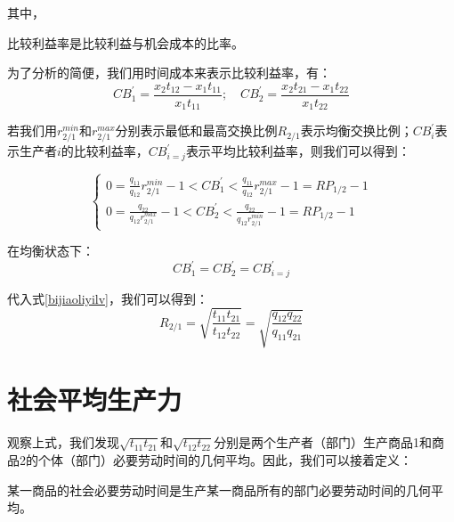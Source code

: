 其中，
\begin{definition}
    比较利益率是比较利益与机会成本的比率\cite[65]{CaiJiMingCongXiaYiJieZhiLunDaoGuangYiJieZhiLunXiuDingBan2022}。
\end{definition}

为了分析的简便，我们用时间成本来表示比较利益率，有：
\begin{equation}
    \label{bijiaoliyilv}
    \mathit{CB}^{\prime}_1 = \frac{x_2 t_{12} - x_1 t_{11}}{x_1 t_{11}}; \quad \mathit{CB}^{\prime}_2 = \frac{x_2 t_{21} - x_1 t_{22}}{x_1 t_{22}}
\end{equation}

若我们用$r^{\mathit{min}}_{2/1}$和$r^{\mathit{max}}_{2/1}$分别表示最低和最高交换比例$\mathit{R}_{2/1}$表示均衡交换比例；$\mathit{CB}^{\prime}_i$表示生产者$i$的比较利益率，$\mathit{CB}^{\prime}_{i=j}$表示平均比较利益率，则我们可以得到\cite[66]{CaiJiMingCongXiaYiJieZhiLunDaoGuangYiJieZhiLunXiuDingBan2022}：

\begin{equation}
    \begin{cases}
        0 = \frac{q_{11}}{q_{12}}r^{\mathit{min}}_{2/1} - 1 < \mathit{CB}^{\prime}_1 < \frac{q_{11}}{q_{12}}r^{\mathit{max}}_{2/1} - 1 = \mathit{RP}_{1/2} - 1 \\
        0 = \frac{q_{22}}{q_{12}r^{\mathit{max}}_{2/1}} - 1 < \mathit{CB}^{\prime}_2 < \frac{q_{22}}{q_{12}r^{\mathit{min}}_{2/1}} - 1 = \mathit{RP}_{1/2} - 1
    \end{cases}
\end{equation}

在均衡状态下：
\begin{equation}
    \mathit{CB}^{\prime}_1 = \mathit{CB}^{\prime}_2 = \mathit{CB}^{\prime}_{i=j}
\end{equation}

代入式\ref{bijiaoliyilv}，我们可以得到：
\begin{equation}
    \label{junhengjiaohuanbili}
    \mathit{R}_{2/1} = \sqrt{\frac{t_{11}t_{21}}{t_{12}t_{22}}} = \sqrt{\frac{q_{12}q_{22}}{q_{11}q_{21}}}
\end{equation}

\section{社会平均生产力}

观察上式，我们发现$\sqrt{t_{11}t_{21}}$和$\sqrt{t_{12}t_{22}}$分别是两个生产者（部门）生产商品1和商品2的个体（部门）必要劳动时间的几何平均。因此，我们可以接着定义：
\begin{definition}
    某一商品的社会必要劳动时间是生产某一商品所有的部门必要劳动时间的几何平均\cite[260]{CaiJiMingCongGuDianZhengZhiJingJiXueDaoZhongGuoTeSeSheHuiZhuYiZhengZhiJingJiXueJiYuZhongGuoShiJiaoDeZhengZhiJingJiXueYanBianShangCe2023}。
\end{definition}


